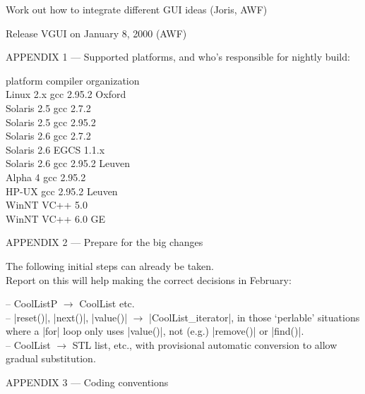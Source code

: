 \documentclass[11pt]{article}
\begin{document}
Work out how to integrate different GUI ideas (Joris, AWF)

Release VGUI on January 8, 2000 (AWF)

\newpage


APPENDIX 1 --- Supported platforms, and who's responsible for nightly build:

  \begin{tabbing}

platform \>	compiler	 \>	organization	\\
Linux 2.x \>	gcc 2.95.2	 \>	Oxford	\\
Solaris 2.5 \>	gcc 2.7.2	 \>		\\
Solaris 2.5 \>	gcc 2.95.2	 \>		\\
Solaris 2.6 \>	gcc 2.7.2	 \>		\\
Solaris 2.6 \>	EGCS 1.1.x	 \>		\\
Solaris 2.6 \>	gcc 2.95.2	 \>	Leuven	\\
Alpha 4 \>	gcc 2.95.2	 \>		\\
HP-UX \>	gcc 2.95.2	 \>	Leuven	\\
WinNT \>	VC++ 5.0	 \>		\\
WinNT \>	VC++ 6.0	 \>	GE	\\

  \end{tabbing}

APPENDIX 2 --- Prepare for the big changes

The following initial steps can already be taken. \\
Report on this will help making the correct decisions in February:

-- CoolListP $\rightarrow$ CoolList etc. \\
-- |reset()|, |next()|, |value()| $\rightarrow$ |CoolList_iterator|, in
those `perlable' situations where a |for| loop only uses |value()|, not (e.g.)
|remove()| or |find()|. \\
-- CoolList $\rightarrow$ STL list, etc., with provisional automatic conversion
to allow gradual substitution.

\vskip1cm

APPENDIX 3 --- Coding conventions
\end{document}
